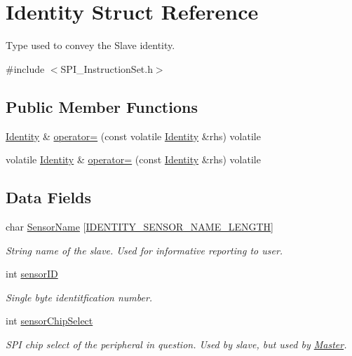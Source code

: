 \hypertarget{struct_identity}{}\section{Identity Struct Reference}
\label{struct_identity}


Type used to convey the Slave identity.  




{\ttfamily \#include $<$S\+P\+I\+\_\+\+Instruction\+Set.\+h$>$}

\subsection*{Public Member Functions}
\begin{DoxyCompactItemize}
\item 
\mbox{\hyperlink{struct_identity}{Identity}} \& \mbox{\hyperlink{struct_identity_ae7ccf6e408df14fac9dc856f53d81718}{operator=}} (const volatile \mbox{\hyperlink{struct_identity}{Identity}} \&rhs) volatile
\item 
volatile \mbox{\hyperlink{struct_identity}{Identity}} \& \mbox{\hyperlink{struct_identity_a64f9786e3b6cd410406d14d124be1e7c}{operator=}} (const \mbox{\hyperlink{struct_identity}{Identity}} \&rhs) volatile
\end{DoxyCompactItemize}
\subsection*{Data Fields}
\begin{DoxyCompactItemize}
\item 
char \mbox{\hyperlink{struct_identity_adc4d380bde0772c5d53a6383e36178cb}{Sensor\+Name}} \mbox{[}\mbox{\hyperlink{_s_p_i___instruction_set_8h_addd001d124aca0fe92b3e484732fb7c8}{I\+D\+E\+N\+T\+I\+T\+Y\+\_\+\+S\+E\+N\+S\+O\+R\+\_\+\+N\+A\+M\+E\+\_\+\+L\+E\+N\+G\+TH}}\mbox{]}
\begin{DoxyCompactList}\small\item\em String name of the slave. Used for informative reporting to user. \end{DoxyCompactList}\item 
int \mbox{\hyperlink{struct_identity_a4f5a5e2cb7ee061dd0bd29b7086d89ac}{sensor\+ID}}
\begin{DoxyCompactList}\small\item\em Single byte identitfication number. \end{DoxyCompactList}\item 
int \mbox{\hyperlink{struct_identity_a219419d57e4c4e0d53ddcb44af330f32}{sensor\+Chip\+Select}}
\begin{DoxyCompactList}\small\item\em S\+PI chip select of the peripheral in question. Used by slave, but used by \mbox{\hyperlink{class_master}{Master}}. \end{DoxyCompactList}\end{DoxyCompactItemize}


